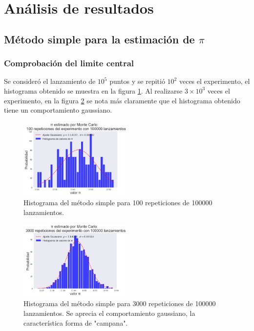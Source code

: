 \documentclass{rbf}
\begin{document}
\section{Análisis de resultados}
\subsection{Método simple para la estimación de $\pi$}
\subsubsection{Comprobación del limite central}
Se consideró el lanzamiento de $10^5$ puntos y se repitió $10^2$ veces el experimento, el histograma obtenido se muestra en la figura \ref{buff1}. Al realizarse $3 \times 10^3$ veces el experimento, en la figura \ref{buff2} se nota más claramente que el histograma obtenido tiene un comportamiento gaussiano.

\begin{figure}[h]
 \centering
  \includegraphics[width=0.5\textwidth]{figures/100rep.png}
	\caption{Histograma del método simple para 100 repeticiones de 100000 lanzamientos.}
 \label{buff1}
\end{figure}

\begin{figure}[tbp!]
 \centering
  \includegraphics[width=0.5\textwidth]{figures/3000rep1e5.png}
	\caption{Histograma del método simple para 3000 repeticiones de 100000 lanzamientos. Se aprecia el comportamiento gaussiano, la característica forma de "campana".}
 \label{buff2}
\end{figure}
\end{document}
